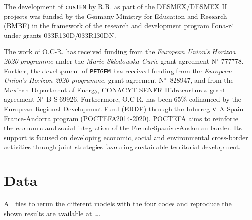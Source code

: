 \documentclass[
    paper,
  ]{geophysics}
\newcommand{\custem}{\texttt{custEM}\xspace}
\newcommand{\petgem}{\texttt{PETGEM}\xspace}
\newcommand{\itodo}[1]{\todo[inline]{\sffamily #1}}
\begin{document}
The development of \custem by R.R. as part of the DESMEX/DESMEX II projects was funded by the Germany Ministry for Education and Research (BMBF) in the framework of the research and development program Fona-r4 under grants 033R130D/033R130DN.

The work of O.C-R. has received funding from the \emph{European Union's Horizon 2020 programme} under the \emph{Marie Sklodowska-Curie} grant agreement N$^\circ$ 777778. Further, the development of \petgem has received funding from the \emph{European Union's Horizon 2020 programme}, grant agreement N$^\circ$~828947, and from the Mexican Department of Energy, CONACYT-SENER Hidrocarburos grant agreement N$^\circ$ B-S-69926. Furthermore, O.C-R. has been 65\% cofinanced by the European Regional Development Fund (ERDF) through the Interreg V-A Spain-France-Andorra program (POCTEFA2014-2020). POCTEFA aims to reinforce the economic and social integration of the French-Spanish-Andorran border. Its support is focused on developing economic, social and environmental cross-border activities through joint strategies favouring sustainable territorial development.


\section{Data}

All files to rerun the different models with the four codes and reproduce the shown results are available at \dots.
\itodo{Put up on Zenodo, link here.}



\end{document}
